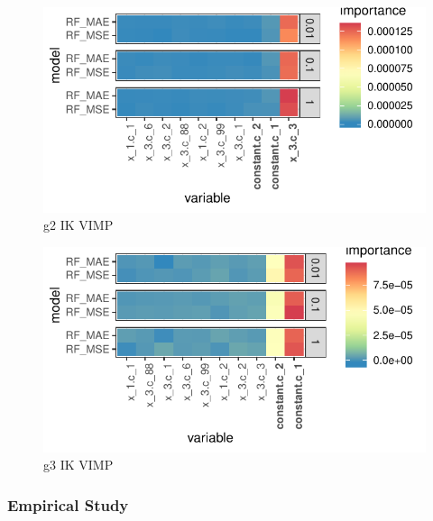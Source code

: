 \documentclass[11pt, a4paper, table]{article}
\begin{document}
\begin{figure}
	\includegraphics[]{../Results/simulation/graphics/simulation_g2_vimp_ik.pdf}
	\caption{g2 IK VIMP}
\end{figure}

\begin{figure}
	\includegraphics[]{../Results/simulation/graphics/simulation_g3_vimp_ik.pdf}
	\caption{g3 IK VIMP}
\end{figure}

\FloatBarrier

\subsubsection{Empirical Study}



\end{document}

